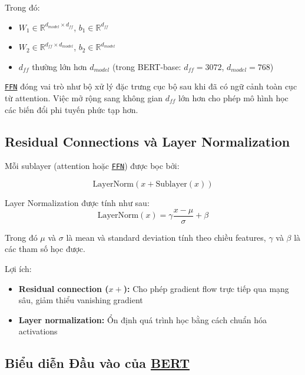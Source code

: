     Trong đó:
    \begin{itemize}
        \item $W_1 \in \mathbb{R}^{d_{model} \times d_{ff}}$, $b_1 \in \mathbb{R}^{d_{ff}}$
        \item $W_2 \in \mathbb{R}^{d_{ff} \times d_{model}}$, $b_2 \in \mathbb{R}^{d_{model}}$
        \item $d_{ff}$ thường lớn hơn $d_{model}$ (trong BERT-base: $d_{ff}=3072$, $d_{model}=768$)
    \end{itemize}
    
    \hyperref[acro:ffn]{\texttt{FFN}} đóng vai trò như bộ xử lý đặc trưng cục bộ sau khi đã có ngữ cảnh toàn cục từ attention. Việc mở rộng sang không gian $d_{ff}$ lớn hơn cho phép mô hình học các biến đổi phi tuyến phức tạp hơn.
    
    \subsection{Residual Connections và Layer Normalization}
    \label{ssec:residual_layer_norm}
    
    Mỗi sublayer (attention hoặc \hyperref[acro:ffn]{\texttt{FFN}}) được bọc bởi:
    
    \begin{equation}
    \text{LayerNorm}(x + \text{Sublayer}(x))
    \label{eq:residual_layernorm}
    \end{equation}
    
    Layer Normalization được tính như sau:
    \begin{equation}
    \text{LayerNorm}(x) = \gamma \frac{x - \mu}{\sigma} + \beta
    \label{eq:layernorm}
    \end{equation}
    
    Trong đó $\mu$ và $\sigma$ là mean và standard deviation tính theo chiều features, $\gamma$ và $\beta$ là các tham số học được.
    
    Lợi ích:
    \begin{itemize}
        \item \textbf{Residual connection ($x +$):} Cho phép gradient flow trực tiếp qua mạng sâu, giảm thiểu vanishing gradient
        \item \textbf{Layer normalization:} Ổn định quá trình học bằng cách chuẩn hóa activations
    \end{itemize}
    
    \subsection{Biểu diễn Đầu vào của \hyperref[acro:bert]{\textbf{BERT}}}
    \label{ssec:input_representation_bert}
    
